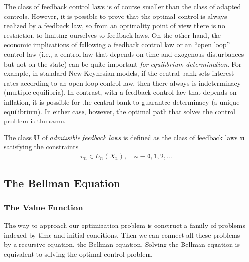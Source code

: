 \documentclass[\topdir/lecture\_notes.tex]{subfiles}
\begin{document}
The class of feedback control laws is of course smaller than the class of adapted controls. However, it is possible to prove that the optimal control is always realized by a feedback law, so from an optimality point of view there is no restriction to limiting ourselves to feedback laws. On the other hand, the economic implications of following a feedback control law or an ``open loop'' control law (i.e., a control law that depends on time and exogenous disturbances but not on the state) can be quite important \textit{for equilibrium determination}. For example, in standard New Keynesian models, if the central bank sets interest rates according to an open loop control law, then there always is indeterminacy (multiple equilibria). In contrast, with a feedback control law that depends on inflation, it is possible for the central bank to guarantee determinacy (a unique equilibrium). In either case, however, the optimal path that solves the control problem is the same.

The class $\mathbf{U}$ of \emph{admissible feedback laws} is defined as the class of feedback laws $\mathbf{u}$ satisfying the constraints
\begin{align*}
u_{n} \in U_{n}(X_{n}), \quad n=0,1,2, \ldots
\end{align*}

\subsection{The Bellman Equation}
\subsubsection*{The Value Function}
The way to approach our optimization problem is construct a family of problems indexed by time and initial conditions. Then we can connect all these problems by a recursive equation, the Bellman equation. Solving the Bellman equation is equivalent to solving the optimal control problem.
\end{document}
